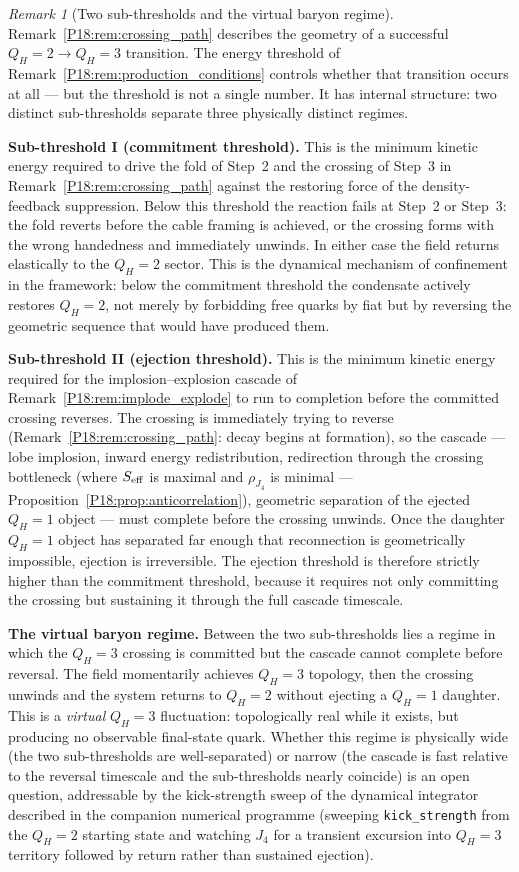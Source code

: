 \documentclass[11pt,a4paper]{article}
\theoremstyle{definition}\newtheorem{definition}[theorem]{Definition}
\theoremstyle{remark}
\newtheorem{remark}[theorem]{Remark}
\newcommand{\QH}{Q_H}
\begin{document}
\begin{remark}[Two sub-thresholds and the virtual baryon regime]
\label{P18:rem:two_thresholds}
Remark~\ref{P18:rem:crossing_path} describes the geometry of a successful
$\QH=2\to\QH=3$ transition.  The energy threshold of
Remark~\ref{P18:rem:production_conditions} controls whether that
transition occurs at all --- but the threshold is not a single
number.  It has internal structure: two distinct sub-thresholds
separate three physically distinct regimes.

\textbf{Sub-threshold I (commitment threshold).}  This is the minimum
kinetic energy required to drive the fold of Step~2 and the crossing
of Step~3 in Remark~\ref{P18:rem:crossing_path} against the restoring
force of the density-feedback suppression.  Below this threshold the
reaction fails at Step~2 or Step~3: the fold reverts before the
cable framing is achieved, or the crossing forms with the wrong
handedness and immediately unwinds.  In either case the field returns
elastically to the $\QH=2$ sector.  This is the dynamical mechanism
of confinement in the framework: below the commitment threshold the
condensate actively restores $\QH=2$, not merely by forbidding free
quarks by fiat but by reversing the geometric sequence that would
have produced them.

\textbf{Sub-threshold II (ejection threshold).}  This is the minimum
kinetic energy required for the implosion--explosion cascade of
Remark~\ref{P18:rem:implode_explode} to run to completion before the
committed crossing reverses.  The crossing is immediately trying to
reverse (Remark~\ref{P18:rem:crossing_path}: decay begins at formation),
so the cascade --- lobe implosion, inward energy redistribution,
redirection through the crossing bottleneck (where $S_{\rm eff}$
is maximal and $\rho_{J_4}$ is minimal ---
Proposition~\ref{P18:prop:anticorrelation}),
geometric separation of the ejected $\QH=1$ object --- must complete
before the crossing unwinds.  Once the daughter $\QH=1$ object has
separated far enough that reconnection is geometrically impossible,
ejection is irreversible.  The ejection threshold is therefore
strictly higher than the commitment threshold, because it requires
not only committing the crossing but sustaining it through the full
cascade timescale.

\textbf{The virtual baryon regime.}  Between the two sub-thresholds
lies a regime in which the $\QH=3$ crossing is committed but the
cascade cannot complete before reversal.  The field momentarily
achieves $\QH=3$ topology, then the crossing unwinds and the system
returns to $\QH=2$ without ejecting a $\QH=1$ daughter.  This is a
\emph{virtual} $\QH=3$ fluctuation: topologically real while it
exists, but producing no observable final-state quark.  Whether this
regime is physically wide (the two sub-thresholds are well-separated)
or narrow (the cascade is fast relative to the reversal timescale and
the sub-thresholds nearly coincide) is an open question, addressable
by the kick-strength sweep of the dynamical integrator described in
the companion numerical programme (sweeping \texttt{kick\_strength}
from the $\QH=2$ starting state and watching $J_4$ for a transient
excursion into $\QH=3$ territory followed by return rather than
sustained ejection).


\end{remark}
\end{document}
